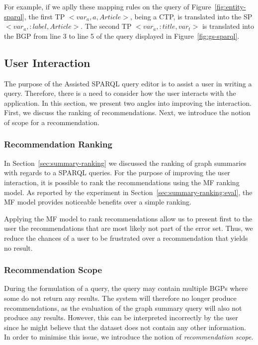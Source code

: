 For example, if we aplly these mapping rules on the query of Figure~\ref{fig:entity-sparql}, the first TP \mbox{$<var_a, a, Article>$}, being a CTP, is translated into the SP \mbox{$<var_a, :label, Article>$}. The second TP \mbox{$<var_a, :title, var_t>$} is translated into the BGP from line 3 to line 5 of the query displayed in Figure~\ref{fig:gs-sparql}.

\subsection{User Interaction}

The purpose of the Assisted SPARQL query editor is to assist a user in writing a query. Therefore, there is a need to consider how the user interacts with the application.
In this section, we present two angles into improving the interaction. First, we discuss the ranking of recommendations. Next, we introduce the notion of scope for a recommendation.

\subsubsection{Recommendation Ranking}

In Section~\ref{sec:summary-ranking} we discussed the ranking of graph summaries with regards to a SPARQL queries. For the purpose of improving the user interaction, it is possible to rank the recommendations using the MF ranking model. As reported by the experiment in Section~\ref{sec:summary-ranking:eval}, the MF model provides noticeable benefits over a simple ranking.

Applying the MF model to rank recommendations allow us to present first to the user the recommendations that are most likely not part of the error set. Thus, we reduce the chances of a user to be frustrated over a recommendation that yields no result.

\subsubsection{Recommendation Scope}

During the formulation of a query, the query may contain multiple BGPs where some do not return any results. The system will therefore no longer produce recommendations, as the evaluation of the graph summary query will also not produce any results. However, this can be interpreted incorrectly by the user since he might believe that the dataset does not contain any other information. In order to minimise this issue, we introduce the notion of \emph{recommendation scope}.\\


